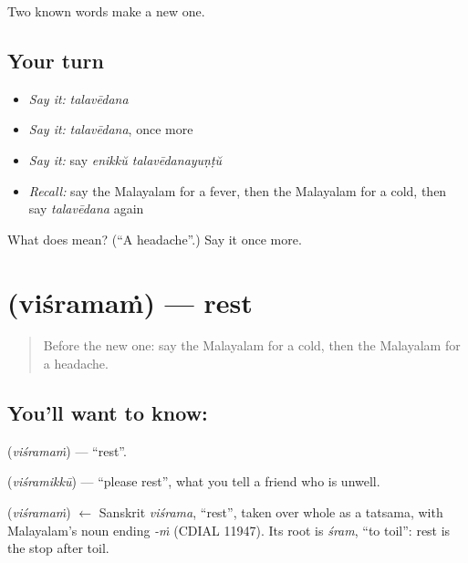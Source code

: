 \begin{grammarlens}[title={What you've built}]
Two known words make a new one.
\end{grammarlens}

\subsection*{Your turn}
\begin{itemize}
\raggedright
  \item \emph{Say it:} \emph{talavēdana}
  \item \emph{Say it:} \emph{talavēdana}, once more
  \item \emph{Say it:} say \emph{enikkŭ talavēdanayuṇṭŭ}
  \item \emph{Recall:} say the Malayalam for a fever, then the Malayalam for a cold, then say \emph{talavēdana} again
\end{itemize}

\begin{tcolorbox}[breakable,colback=teal!4,colframe=teal!35!black,title={Before you move on}]
What does  mean? (\textquotedblleft{}A headache\textquotedblright{}.) Say it once more.
\end{tcolorbox}
\section[\texorpdfstring{\ml{വിശ്രമം} (viśramaṁ)}{വിശ്രമം (viśramaṁ)}]{ (viśramaṁ) — rest}

\label{lesson:ML-C115-rest}



\begin{quote}
Before the new one: say the Malayalam for a cold, then the Malayalam for a headache.
\end{quote}

\subsection*{You'll want to know: }
\textbf{} (\emph{viśramaṁ}) — \textquotedblleft{}rest\textquotedblright{}.

\textbf{} (\emph{viśramikkū}) — \textquotedblleft{}please rest\textquotedblright{}, what you tell a friend who is unwell.

\begin{cousinweb}
\textbf{} (\emph{viśramaṁ}) $\leftarrow$ Sanskrit \emph{viśrama}, \textquotedblleft{}rest\textquotedblright{}, taken over whole as a tatsama, with Malayalam's noun ending \emph{-ṁ} (CDIAL 11947). Its root is \emph{śram}, \textquotedblleft{}to toil\textquotedblright{}: rest is the stop after toil.
\end{cousinweb}

